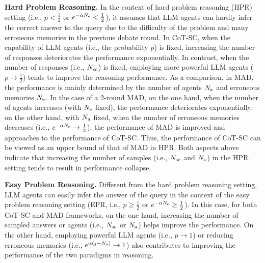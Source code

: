 \documentclass{article} %
\theoremstyle{plain}
\begin{document}
\textbf{Hard Problem Reasoning.} In the context of hard problem reasoning (HPR) setting (i.e., $p<\frac{1}{2}$ or $e^{-\alpha N_{\rm e}}<\frac{1}{2}$), it assumes that LLM agents can hardly infer the correct answer to the query due to the difficulty of the problem and many erroneous memories in the previous debate round. In CoT-SC, when the capability of LLM agents (i.e., the probability $p$) is fixed, increasing the number of responses deteriorates the performance exponentially. In contrast, when the number of responses (i.e., $N_{\rm sc}$) is fixed, employing more powerful LLM agents ($p\to\frac{1}{2}$) tends to improve the reasoning performance. As a comparison, in MAD, the performance is mainly determined by the number of agents $N_{\rm a}$ and erroneous memories $N_{\rm e}$. In the case of a 2-round MAD, on the one hand, when the number of agents increases (with $N_{\rm e}$ fixed), the performance deteriorates exponentially; on the other hand, with $N_{\rm a}$ fixed, when the number of erroneous memories decreases (i.e., $e^{-\alpha N_{\rm e}}\rightarrow\frac{1}{2}$), the performance of MAD is improved and approaches to the performance of CoT-SC. Thus, the performance of CoT-SC can be viewed as an upper bound of that of MAD in HPR. Both aspects above indicate that increasing the number of samples (i.e., $N_{\rm sc}$ and $N_{\rm a}$) in the HPR setting tends to result in performance collapse. %

\textbf{Easy Problem Reasoning.} Different from the hard problem reasoning setting, LLM agents can easily infer the answer of the query in the context of the easy problem reasoning setting (EPR, i.e., $p\ge\frac{1}{2}$ or $e^{-\alpha N_{\rm e}}\ge\frac{1}{2}$). In this case, for both CoT-SC and MAD frameworks, on the one hand, increasing the number of sampled answers or agents (i.e., $N_{\rm sc}$ or $N_{\rm a}$) helps improve the performance. On the other hand, employing powerful LLM agents (i.e., $p\to1$) or reducing erroneous memories (i.e., $e^{\alpha(j-N_{\rm a})}\to1$) also contributes to improving the performance of the two paradigms in reasoning. 
\end{document}
